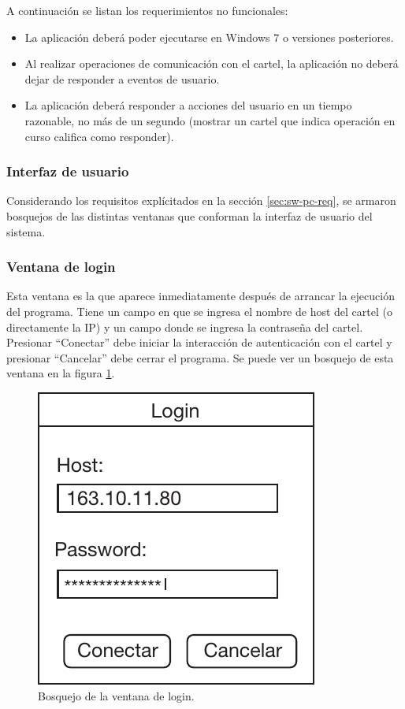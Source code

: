 A continuación se listan los requerimientos no funcionales:
\begin{itemize}
	\item La aplicación deberá poder ejecutarse en Windows 7 o versiones posteriores.
	\item Al realizar operaciones de comunicación con el cartel, la aplicación no deberá dejar de responder a eventos de usuario.
	\item La aplicación deberá responder a acciones del usuario en un tiempo razonable, no más de un segundo (mostrar un cartel que indica operación en curso califica como responder).
\end{itemize}

\subsubsection{Interfaz de usuario}
Considerando los requisitos explícitados en la sección \ref{sec:sw-pc-req}, se armaron bosquejos de las distintas ventanas que conforman la interfaz de usuario del sistema.

\subsubsection{Ventana de login}
Esta ventana es la que aparece inmediatamente después de arrancar la ejecución del programa. Tiene un campo en que se ingresa el nombre de host del cartel (o directamente la IP) y un campo donde se ingresa la contraseña del cartel. Presionar \enquote{Conectar} debe iniciar la interacción de autenticación con el cartel y presionar \enquote{Cancelar} debe cerrar el programa. Se puede ver un bosquejo de esta ventana en la figura \ref{fig:skgui-login}.

\begin{figure}
	\centering
	\includegraphics[scale=0.8]{imagenes/skgui-login.pdf}
	\caption{Bosquejo de la ventana de login.}
	\label{fig:skgui-login}
\end{figure}

